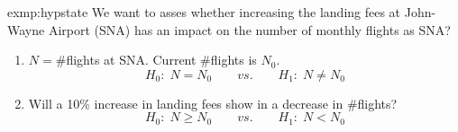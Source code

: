 	\begin{exmp}{exmp:hypstate}
		We want to asses whether increasing the landing fees at John-Wayne Airport (SNA) has an impact on the number of monthly flights as SNA?
		\begin{enumerate}
			\item $N=\#$flights at SNA. Current $\#$flights is $N_0$.
				\begin{equation*}
					H_0:\;N=N_0\qquad vs. \qquad H_1:\;N\neq N_0
				\end{equation*}
			\item Will a 10\% increase in landing fees show in a decrease in $\#$flights?
				\begin{equation*}
				H_0:\;N\geq N_0\qquad vs. \qquad H_1:\;N<N_0
				\end{equation*}
		\end{enumerate}
	\end{exmp}
